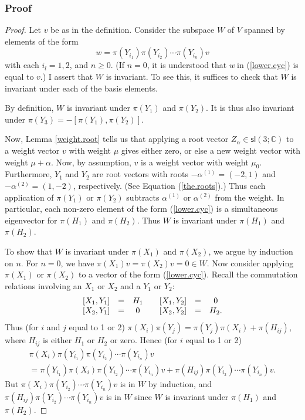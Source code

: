\documentclass[12pt]{amsbook}
\theoremstyle{plain}
\numberwithin{equation}{chapter}
\numberwithin{theorem}{chapter}
\begin{document}
\subsubsection{Proof}

\begin{proof}
Let $v$ be as in the definition. Consider the subspace $W$ of $V$ spanned by
elements of the form
\begin{equation}
w=\pi(Y_{i_{1}})\pi(Y_{i_{2}})\cdots\pi(Y_{i_{n}})v\label{lower.cyc}%
\end{equation}
with each $i_{l}=1,2$, and $n\geq0$. (If $n=0$, it is understood that $w\ $in
(\ref{lower.cyc}) is equal to $v$.) I assert that $W$ is invariant. To see
this, it suffices to check that $W$ is invariant under each of the basis elements.

By definition, $W$ is invariant under $\pi(Y_{1})$ and $\pi(Y_{2})$. It is
thus also invariant under $\pi(Y_{3})=-\left[  \pi(Y_{1}),\pi(Y_{2})\right]  $.

Now, Lemma \ref{weight.root} tells us that applying a root vector $Z_{\alpha
}\in\mathsf{sl}\left(  3;\mathbb{C}\right)  $ to a weight vector $v$ with
weight $\mu$ gives either zero, or else a new weight vector with weight
$\mu+\alpha$. Now, by assumption, $v$ is a weight vector with weight $\mu_{0}%
$. Furthermore, $Y_{1}$ and $Y_{2}$ are root vectors with roots $-\alpha
^{(1)}=(-2,1)$ and $-\alpha^{(2)}=(1,-2)$, respectively. (See Equation
(\ref{the.roots}).) Thus each application of $\pi(Y_{1})$ or $\pi(Y_{2})$
subtracts $\alpha^{(1)}$ or $\alpha^{(2)}$ from the weight. In particular,
each non-zero element of the form (\ref{lower.cyc}) is a simultaneous
eigenvector for $\pi(H_{1})$ and $\pi(H_{2})$. Thus $W$ is invariant under
$\pi(H_{1})$ and $\pi(H_{2})$.

To show that $W$ is invariant under $\pi(X_{1})$ and $\pi(X_{2})$, we argue by
induction on $n$. For $n=0$, we have $\pi(X_{1})v=\pi(X_{2})v=0\in W$. Now
consider applying $\pi(X_{1})$ or $\pi(X_{2})$ to a vector of the form
(\ref{lower.cyc}). Recall the commutation relations involving an $X_{1}$ or
$X_{2}$ and a $Y_{1}$ or $Y_{2}$:
\[%
\begin{array}
[c]{ccccccc}%
\left[  X_{1},Y_{1}\right]   & = & H_{1} &  & \left[  X_{1},Y_{2}\right]   &
= & 0\\
\left[  X_{2},Y_{1}\right]   & = & 0 &  & \left[  X_{2},Y_{2}\right]   & = &
H_{2}\text{.}%
\end{array}
\]
Thus (for $i$ and $j$ equal to 1 or 2) $\pi(X_{i})\pi(Y_{j})=\pi(Y_{j}%
)\pi(X_{i})+\pi(H_{ij})$, where $H_{ij}$ is either $H_{1}$ or $H_{2}$ or zero.
Hence (for $i$ equal to 1 or 2)
\begin{align*}
\pi(X_{i})\pi(Y_{i_{1}})\pi(Y_{i_{2}})\cdots\pi(Y_{i_{n}})v\\
=\pi(Y_{i_{1}})\pi(X_{i})\pi(Y_{i_{2}})\cdots\pi(Y_{i_{n}})v+\pi(H_{ij}%
)\pi(Y_{i_{2}})\cdots\pi(Y_{i_{n}})v\text{.}%
\end{align*}
But $\pi(X_{i})\pi(Y_{i_{2}})\cdots\pi(Y_{i_{n}})v$ is in $W$ by induction,
and $\pi(H_{ij})\pi(Y_{i_{2}})\cdots\pi(Y_{i_{n}})v$ is in $W$ since $W$ is
invariant under $\pi(H_{1})$ and $\pi(H_{2})$.


\end{proof}
\end{document}
